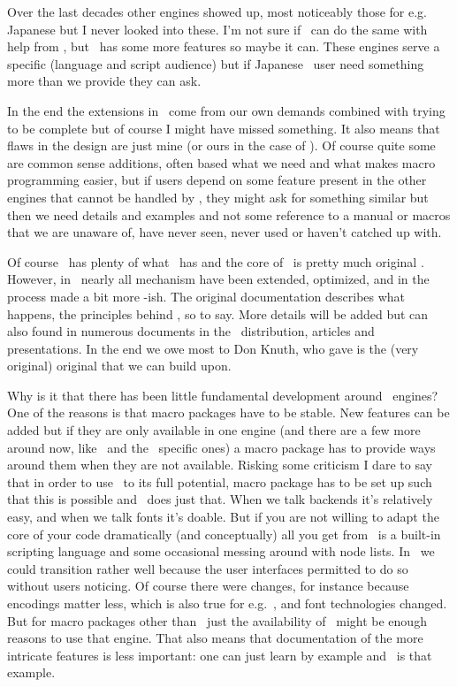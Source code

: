 Over the last decades other engines showed up, most noticeably those for e.g.
Japanese but I never looked into these. I'm not sure if \LUATEX\ can do the same
with help from \LUA, but \LUAMETATEX\ has some more features so maybe it can.
These engines serve a specific (language and script audience) but if Japanese
\CONTEXT\ user need something more than we provide they can ask.

In the end the extensions in \LUAMETATEX\ come from our own demands combined with
trying to be complete but of course I might have missed something. It also means
that flaws in the design are just mine (or ours in the case of \LUATEX). Of
course quite some are common sense additions, often based what we need and what
makes macro programming easier, but if users depend on some feature present in
the other engines that cannot be handled by \LUA, they might ask for something
similar but then we need details and examples and not some reference to a manual
or macros that we are unaware of, have never seen, never used or haven't catched
up with.

Of course \LUAMETATEX\ has plenty of what \LUATEX\ has and the core of \LUATEX\
is pretty much original \TEX. However, in \LUAMETATEX\ nearly all mechanism have
been extended, optimized, and in the process made a bit more \CCODE-ish. The
original documentation describes what happens, the principles behind \TEX, so to
say. More details will be added but can also found in numerous documents in the
\CONTEXT\ distribution, articles and presentations. In the end we owe most to Don
Knuth, who gave is the (very original) original that we can build upon.

\stopsection

\startsection[title=Usage]

Why is it that there has been little fundamental development around \TEX\
engines? One of the reasons is that macro packages have to be stable. New
features can be added but if they are only available in one engine (and there are
a few more around now, like \XETEX\ and the \CJK\ specific ones) a macro package
has to provide ways around them when they are not available. Risking some
criticism I dare to say that in order to use \LUATEX\ to its full potential,
macro package has to be set up such that this is possible and \CONTEXT\ does just
that. When we talk backends it's relatively easy, and when we talk fonts it's
doable. But if you are not willing to adapt the core of your code dramatically
(and conceptually) all you get from \LUATEX\ is a built-in scripting language and
some occasional messing around with node lists. In \CONTEXT\ we could transition
rather well because the user interfaces permitted to do so without users
noticing. Of course there were changes, for instance because encodings matter
less, which is also true for e.g.\ \XETEX, and font technologies changed. But for
macro packages other than \CONTEXT\ just the availability of \LUA\ might be
enough reasons to use that engine. That also means that documentation of the more
intricate features is less important: one can just learn by example and \CONTEXT\
is that example.

